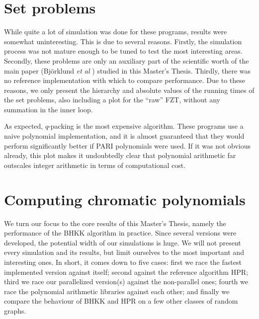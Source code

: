 \documentclass{cslthse-msc}
\begin{document}
\section{Set problems}\label{setproblems_experiment}
While quite a lot of simulation was done for these programs, results were somewhat uninteresting. This is due to several reasons. Firstly, the simulation process was not mature enough to be tuned to test the most interesting areas. Secondly, these problems are only an auxiliary part of the scientific worth of the main paper (Björklund \emph{et al} \cite{cov_pack}) studied in this Master's Thesis. Thirdly, there was no reference implementation with which to compare performance. Due to these reasons, we only present the hierarchy and absolute values of the running times of the set problems, also including a plot for the ``raw'' FZT, without any summation in the inner loop.
\begin{center}
\end{center}
As expected, $q$-packing is the most expensive algorithm. These programs use a naive polynomial implementation, and it is almost guaranteed that they would perform significantly better if PARI polynomials were used. If it was not obvious already, this plot makes it undoubtedly clear that polynomial arithmetic far outscales integer arithmetic in terms of computational cost.

\section{Computing chromatic polynomials}
We turn our focus to the core results of this Master's Thesis, namely the performance of the BHKK algorithm in practice. Since several versions were developed, the potential width of our simulations is huge. We will not present every simulation and its results, but limit ourselves to the most important and interesting ones. In short, it comes down to five cases: first we race the fastest implemented version against itself; second against the reference algorithm HPR; third we race our parallelized version(s) against the non-parallel ones; fourth we race the polynomial arithmetic libraries against each other; and finally we compare the behaviour of BHKK and HPR on a few other classes of random graphs.
\end{document}
